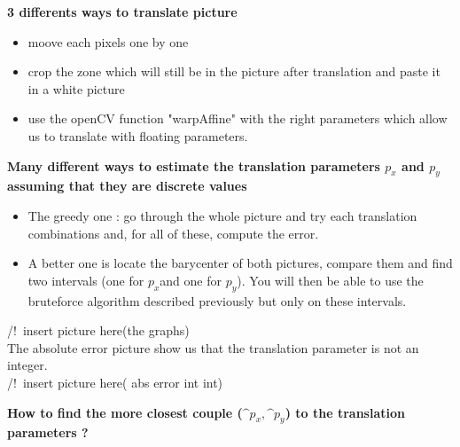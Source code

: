 \documentclass[]{report}
\title{}
\author{}
\begin{document}
	
	


\maketitle
\begin{center}
\textbf{3 differents ways to translate picture} 
\end{center}

\begin{itemize}
	
	\item moove each pixels one by one
	\item crop the zone which will still be in the picture after translation and paste it in a white picture
	\item use the openCV function "warpAffine" with the right parameters which allow us to translate with floating parameters.

\end{itemize}

\newpage

\begin{center}
	\textbf{Many different ways to estimate the translation parameters $p_x$ and $p_y$ assuming that they are discrete values} 
\end{center}

\begin{itemize}
	\item The greedy one : go through the whole picture and try each translation combinations and, for all of these, compute the error.\\
	
	\item A better one is locate the barycenter of both pictures, compare them and find two intervals (one for $p_x$and one for $p_y$). You will then be able to use the bruteforce algorithm described previously but only on these intervals.\\
\end{itemize}

/!\ insert picture here(the graphs)\\


The absolute error picture show us that the translation parameter is not an integer.\\

/!\ insert picture here( abs error int int)\\


\newpage

\begin{center}
	\textbf{How to find the more closest couple ($\^p_x,\^p_y$) to the translation parameters ? } 
	
\end{center}
\end{document}
